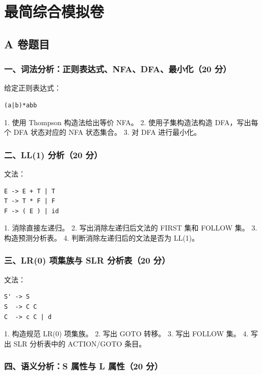 \documentclass[UTF8]{ctexart}
\begin{document}
\section*{最简综合模拟卷}

\subsection*{A 卷题目}

\subsubsection*{一、词法分析：正则表达式、NFA、DFA、最小化（20 分）}

给定正则表达式：

\begin{Verbatim}[fontsize=\small,breaklines=true]
(a|b)*abb
\end{Verbatim}

1. 使用 Thompson 构造法给出等价 NFA。 2. 使用子集构造法构造 DFA，写出每个 DFA 状态对应的 NFA 状态集合。 3. 对 DFA 进行最小化。

\subsubsection*{二、LL(1) 分析（20 分）}

文法：

\begin{Verbatim}[fontsize=\small,breaklines=true]
E -> E + T | T
T -> T * F | F
F -> ( E ) | id
\end{Verbatim}

1. 消除直接左递归。 2. 写出消除左递归后文法的 FIRST 集和 FOLLOW 集。 3. 构造预测分析表。 4. 判断消除左递归后的文法是否为 LL(1)。

\subsubsection*{三、LR(0) 项集族与 SLR 分析表（20 分）}

文法：

\begin{Verbatim}[fontsize=\small,breaklines=true]
S' -> S
S  -> C C
C  -> c C | d
\end{Verbatim}

1. 构造规范 LR(0) 项集族。 2. 写出 GOTO 转移。 3. 写出 FOLLOW 集。 4. 写出 SLR 分析表中的 ACTION/GOTO 条目。

\subsubsection*{四、语义分析：S 属性与 L 属性（20 分）}
\end{document}
